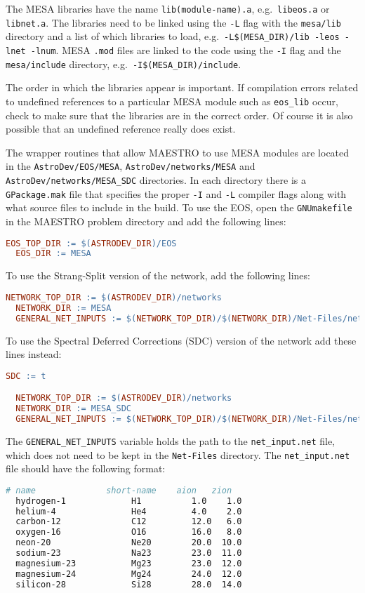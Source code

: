 The {\sf MESA} libraries have the name {\tt lib(module-name).a}, e.g.\ 
{\tt libeos.a} or {\tt libnet.a}. The libraries need to be linked using the 
{\tt -L} flag with the {\tt mesa/lib} directory and a list of which libraries 
to load, e.g.\ {\tt -L\$(MESA\_DIR)/lib -leos -lnet -lnum}. {\sf MESA} 
{\tt .mod} files are linked to the code using the {\tt -I} flag and the 
{\tt mesa/include} directory, e.g.\ {\tt -I\$(MESA\_DIR)/include}. 

The order in which the libraries appear is important. If compilation errors 
related to undefined references to a particular {\sf MESA} module such as 
{\tt eos\_lib} occur, check to make sure that the libraries are in the correct 
order. Of course it is also possible that an undefined reference really does 
exist.

The wrapper routines that allow {\sf MAESTRO} to use {\sf MESA} modules are 
located in the {\tt AstroDev/EOS/MESA}, {\tt AstroDev/networks/MESA} and 
{\tt AstroDev/networks/MESA\_SDC} 
directories. In each directory there is a {\tt GPackage.mak} file that 
specifies the proper {\tt -I} and {\tt -L} compiler flags along with what 
source files to include in the build. To use the EOS, open the 
{\tt GNUmakefile} in the {\sf MAESTRO} problem directory and add the 
following lines:
\begin{lstlisting}[language=make,mathescape=false]
  EOS_TOP_DIR := $(ASTRODEV_DIR)/EOS
  EOS_DIR := MESA
\end{lstlisting}
To use the Strang-Split version of the network, add the following lines:
\begin{lstlisting}[language=make,mathescape=false]
  NETWORK_TOP_DIR := $(ASTRODEV_DIR)/networks
  NETWORK_DIR := MESA
  GENERAL_NET_INPUTS := $(NETWORK_TOP_DIR)/$(NETWORK_DIR)/Net-Files/net_input.net
\end{lstlisting}
To use the Spectral Deferred Corrections (SDC) version of the network add 
these lines instead:
\begin{lstlisting}[language=make,mathescape=false]
  SDC := t

  NETWORK_TOP_DIR := $(ASTRODEV_DIR)/networks
  NETWORK_DIR := MESA_SDC
  GENERAL_NET_INPUTS := $(NETWORK_TOP_DIR)/$(NETWORK_DIR)/Net-Files/net_input.net
\end{lstlisting}
The {\tt GENERAL\_NET\_INPUTS} variable holds the path to the
{\tt net\_input.net} file, which does not need to be kept in the
{\tt Net-Files} directory. The {\tt net\_input.net} file should have the 
following format:
\begin{lstlisting}[language=make,mathescape=false]
  # name              short-name    aion   zion
  hydrogen-1             H1          1.0    1.0
  helium-4               He4         4.0    2.0
  carbon-12              C12         12.0   6.0
  oxygen-16              O16         16.0   8.0
  neon-20                Ne20        20.0  10.0
  sodium-23              Na23        23.0  11.0
  magnesium-23           Mg23        23.0  12.0
  magnesium-24           Mg24        24.0  12.0
  silicon-28             Si28        28.0  14.0
\end{lstlisting}


